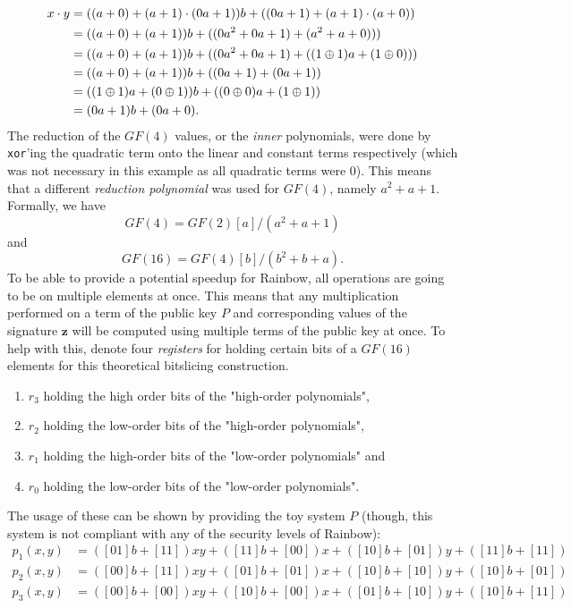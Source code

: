 \begin{equation*}
    \begin{split}
        x\cdot y &= ((a + 0) + (a + 1) \cdot (0a + 1))b + ((0a + 1) + (a + 1) \cdot (a + 0))\\
        &= ((a + 0) + (a + 1))b + ((0a^2 + 0a + 1) + (a^2 + a + 0)))\\
        &= ((a + 0) + (a + 1))b + ((0a^2 + 0a + 1) + ((1 \oplus 1)a + (1 \oplus 0)))\\
        &= ((a + 0) + (a + 1))b + ((0a + 1) + (0a + 1))\\
        &= ((1 \oplus 1)a + (0 \oplus 1))b + ((0 \oplus 0)a + (1 \oplus 1))\\
        &= (0a + 1)b + (0a + 0).
    \end{split}
\end{equation*}
The reduction of the $GF(4)$ values, or the \textit{inner} polynomials, were done by \texttt{xor}'ing the quadratic term onto the linear and constant terms respectively (which was not necessary in this example as all quadratic terms were 0). This means that a different \emph{reduction polynomial} was used for $GF(4)$, namely $a^2 + a + 1$. Formally, we have
$$
    GF(4) = GF(2)[a]/(a^2 + a + 1)
$$
and
$$
    GF(16) = GF(4)[b]/(b^2 + b + a).
$$
To be able to provide a potential speedup for Rainbow, all operations are going to be on multiple elements at once. This means that any multiplication performed on a term of the public key $P$ and corresponding values of the signature $\textbf{z}$ will be computed using multiple terms of the public key at once. To help with this, denote four \emph{registers} for holding certain bits of a $GF(16)$ elements for this theoretical bitslicing construction.
\begin{enumerate}
    \item $r_3$ holding the high order bits of the "high-order polynomials",
    \item $r_2$ holding the low-order bits of the "high-order polynomials",
    \item $r_1$ holding the high-order bits of the "low-order polynomials" and
    \item $r_0$ holding the low-order bits of the "low-order polynomials".
\end{enumerate}
The usage of these can be shown by providing the toy system $P$ (though, this system is not compliant with any of the security levels of Rainbow):
\begin{equation*}
    \begin{split}
        p_1(x,y) &= ([01]b + [11]) xy + ([11]b + [00]) x + ([10]b + [01]) y + ([11]b + [11])\\
        p_2(x,y) &= ([00]b + [11]) xy + ([01]b + [01]) x + ([10]b + [10]) y + ([10]b + [01])\\
        p_3(x,y) &= ([00]b + [00]) xy + ([10]b + [00]) x + ([01]b + [10]) y + ([10]b + [11])
    \end{split}
\end{equation*}
